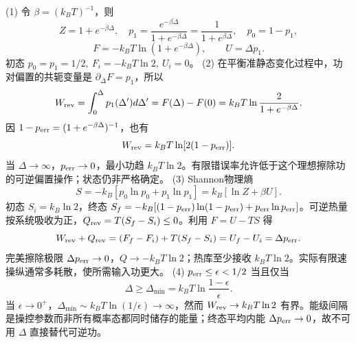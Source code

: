 (1) 令 \(\beta=(k_BT)^{-1}\)，则
\[
Z=1+e^{-\beta\Delta},\quad
p_1=\frac{e^{-\beta\Delta}}{1+e^{-\beta\Delta}}
=\frac1{1+e^{\beta\Delta}},\quad p_0=1-p_1,
\]
\[
F=-k_BT\ln(1+e^{-\beta\Delta}),\qquad U=\Delta p_1.
\]
初态 \(p_0=p_1=1/2,\ F_i=-k_BT\ln2,\ U_i=0\)。
(2) 在平衡准静态变化过程中，功对偏置的共轭变量是 \(\partial_\Delta F=p_1\)，所以
\[
W_{\rm rev}=\int_0^\Delta p_1(\Delta')d\Delta'
=F(\Delta)-F(0)
=k_BT\ln\frac{2}{1+e^{-\beta\Delta}}.
\]
因 \(1-p_{\rm err}=(1+e^{-\beta\Delta})^{-1}\)，也有
\[
W_{\rm rev}=k_BT\ln[2(1-p_{\rm err})].
\]
当 \(\Delta\to\infty\)，\(p_{\rm err}\to0\)，最小功趋 \(k_BT\ln2\)。有限错误率允许低于这个理想擦除功的可逆偏置操作；状态仍非严格确定。
(3) Shannon物理熵
\[
S=-k_B[p_0\ln p_0+p_1\ln p_1]
=k_B[\ln Z+\beta U].
\]
初态 \(S_i=k_B\ln2\)，终态 \(S_f=-k_B[(1-p_{\rm err})\ln(1-p_{\rm err})+p_{\rm err}\ln p_{\rm err}]\)。可逆热量按系统吸收为正，\(Q_{\rm rev}=T(S_f-S_i)\le0\)。利用 \(F=U-TS\) 得
\[
W_{\rm rev}+Q_{\rm rev}=(F_f-F_i)+T(S_f-S_i)=U_f-U_i=\Delta p_{\rm err}.
\]
完美擦除极限 \(\Delta p_{\rm err}\to0\)，\(Q\to-k_BT\ln2\)；热库至少接收 \(k_BT\ln2\)。实际有限速操纵通常多耗散，使所需输入功更大。
(4) \(p_{\rm err}\le\epsilon<1/2\) 当且仅当
\[
\Delta\ge\Delta_{\min}=k_BT\ln\frac{1-\epsilon}{\epsilon}.
\]
当 \(\epsilon\to0^+\)，\(\Delta_{\min}\sim k_BT\ln(1/\epsilon)\to\infty\)，然而 \(W_{\rm rev}\to k_BT\ln2\) 有界。能级间隔是操控参数而非所有概率态都同时储存的能量；终态平均内能 \(\Delta p_{\rm err}\to0\)，故不可用 \(\Delta\) 直接替代可逆功。
